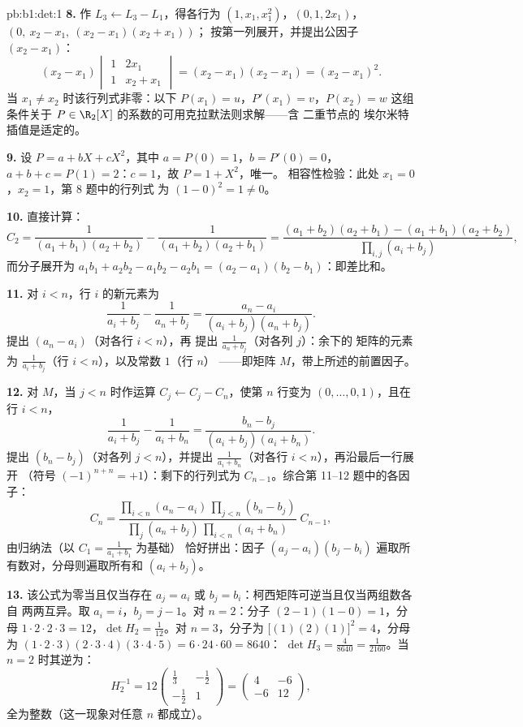 \begin{solution}{pb:b1:det:1}
\textbf{8.} 作 $L_3 \leftarrow L_3 - L_1$，得各行为 $(1, x_1,
x_1^2)$，$(0, 1, 2x_1)$，$(0,\ x_2 - x_1,\ (x_2-x_1)(x_2+x_1))$；
按第一列展开，并提出公因子 $(x_2 - x_1)$：
\[
(x_2 - x_1)\begin{vmatrix} 1 & 2x_1\\ 1 & x_2 + x_1
\end{vmatrix} = (x_2 - x_1)(x_2 - x_1) = (x_2 - x_1)^2 .
\]
当 $x_1 \neq x_2$ 时该行列式非零：以下
$P(x_1) = u$，$P'(x_1) = v$，$P(x_2) = w$ 这组条件关于
$P \in \R_2[X]$ 的系数的可用克拉默法则求解——含
二重节点的 埃尔米特插值是适定的。

\textbf{9.} 设 $P = a + bX + cX^2$，其中 $a = P(0) = 1$，$b = P'(0)
= 0$，$a + b + c = P(1) = 2$：$c = 1$，故 $P = 1 + X^2$，唯一。
相容性检验：此处 $x_1 = 0$，$x_2 = 1$，第 8 题中的行列式
为 $(1 - 0)^2 = 1 \neq 0$。

\textbf{10.} 直接计算：
\[
C_2 = \frac{1}{(a_1+b_1)(a_2+b_2)} - \frac{1}{(a_1+b_2)(a_2+b_1)}
= \frac{(a_1+b_2)(a_2+b_1) - (a_1+b_1)(a_2+b_2)}
{\prod_{i,j}(a_i+b_j)} ,
\]
而分子展开为 $a_1b_1 + a_2b_2 - a_1b_2 - a_2b_1
= (a_2 - a_1)(b_2 - b_1)$：即差比和。

\textbf{11.} 对 $i < n$，行 $i$ 的新元素为
\[
\frac{1}{a_i + b_j} - \frac{1}{a_n + b_j}
= \frac{a_n - a_i}{(a_i + b_j)(a_n + b_j)} .
\]
提出 $(a_n - a_i)$（对各行 $i < n$），再
提出 $\frac1{a_n + b_j}$（对各列 $j$）：余下的
矩阵的元素为 $\frac1{a_i + b_j}$（行 $i < n$），以及常数 $1$（行 $n$）
——即矩阵 $M$，带上所述的前置因子。

\textbf{12.} 对 $M$，当 $j < n$ 时作运算 $C_j \leftarrow
C_j - C_n$，使第 $n$ 行变为 $(0, \dots, 0, 1)$，且在行 $i
< n$，
\[
\frac{1}{a_i + b_j} - \frac{1}{a_i + b_n}
= \frac{b_n - b_j}{(a_i + b_j)(a_i + b_n)} .
\]
提出 $(b_n - b_j)$（对各列 $j < n$），并提出 $\frac1{a_i +
b_n}$（对各行 $i < n$），再沿最后一行展开
（符号 $(-1)^{n+n} = +1$）：剩下的行列式为
$C_{n-1}$。综合第 11--12 题中的各因子：
\[
C_n = \frac{\prod_{i<n}(a_n - a_i)\,\prod_{j<n}(b_n - b_j)}
{\prod_{j}(a_n + b_j)\,\prod_{i<n}(a_i + b_n)}\;C_{n-1},
\]
由归纳法（以 $C_1 = \frac1{a_1+b_1}$ 为基础）
恰好拼出：因子 $(a_j - a_i)(b_j
- b_i)$ 遍取所有数对，分母则遍取所有和 $(a_i + b_j)$。

\textbf{13.} 该公式为零当且仅当存在 $a_j = a_i$ 或 $b_j =
b_i$：柯西矩阵可逆当且仅当两组数各自
两两互异。取 $a_i = i$，$b_j = j - 1$。对 $n =
2$：分子 $(2-1)(1-0) = 1$，分母 $1\cdot2\cdot2\cdot3
= 12$，$\det H_2 = \frac1{12}$。对 $n = 3$，分子为
$\bigl[(1)(2)(1)\bigr]^2 = 4$，分母为 $(1\cdot2\cdot3)
(2\cdot3\cdot4)(3\cdot4\cdot5) = 6\cdot24\cdot60 = 8640$：
$\det H_3 = \frac{4}{8640} = \frac1{2160}$。当 $n = 2$ 时其逆为：
\[
H_2^{-1} = 12\begin{pmatrix} \frac13 & -\frac12\\[2pt]
-\frac12 & 1\end{pmatrix}
= \begin{pmatrix} 4 & -6\\ -6 & 12 \end{pmatrix},
\]
全为整数（这一现象对任意 $n$ 都成立）。


\end{solution}
